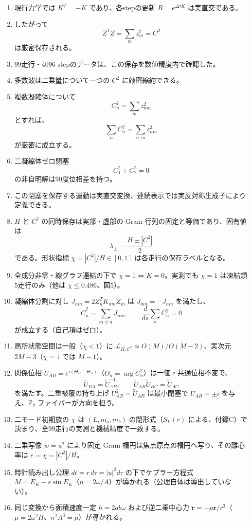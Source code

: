 \documentclass[
  a4paper,
]{ltjsarticle}
\providecommand{\tightlist}{%
  \setlength{\itemsep}{0pt}\setlength{\parskip}{0pt}}
\begin{document}
\begin{enumerate}
\def\labelenumi{\arabic{enumi}.}
\tightlist
\item
  現行力学では \(K^T=-K\) であり、各stepの更新 \(R=e^{\Delta\tau K}\)
  は実直交である。
\item
  したがって \[
  Z^TZ=\sum_mz_m^2=C^2
  \] は厳密保存される。
\item
  99走行・4096 stepのデータは、この保存を数値精度内で確認した。
\item
  多数波は二乗量について一つの \(C^2\) に厳密縮約できる。
\item
  複数凝縮体について \[
  C_n^2=\sum_mz_{nm}^2
  \] とすれば、 \[
  \sum_nC_n^2=\sum_{n,m}z_{nm}^2
  \] が厳密に成立する。
\item
  二凝縮体ゼロ閉塞 \[
  C_1^2+C_2^2=0
  \] の非自明解は90度位相差を持つ。
\item
  この閉塞を保存する運動は実直交変換、連続表示では実反対称生成子により定義できる。
\item
  \(H\) と \(C^2\) の同時保存は実部・虚部の Gram
  行列の固定と等価であり、固有値は \[
  \lambda_\pm=\frac{H\pm|C^2|}{2}
  \] である。形状指標 \(\chi=|C^2|/H\in[0,1]\)
  は各走行の保存ラベルとなる。
\item
  全成分非零・線グラフ連結の下で \(\chi=1\iff K=0\)。実測でも \(\chi=1\)
  は凍結類5走行のみ（他は \(\chi\le0.486\)、図5）。
\item
  凝縮体分割に対し \(J_{nm}=2Z_n^TK_{nm}Z_m\) は \(J_{mn}=-J_{nm}\)
  を満たし、 \[
  \dot C_n^2=\sum_{m\ne n}J_{nm},
  \qquad
  \frac{d}{ds}\sum_nC_n^2=0
  \] が成立する（自己項はゼロ）。
\item
  局所状態空間は一般（\(\chi<1\)）に
  \(\mathcal L_{H,C^2}\simeq O(M)/O(M-2)\)、実次元 \(2M-3\)（\(\chi=1\)
  では \(M-1\)）。
\item
  関係位相
  \(\tilde U_{AB}=e^{i(\Theta_B-\Theta_A)}\)（\(\Theta_n=\arg C_n^2\)）は一価・共通位相不変で、
  \[
  \tilde U_{BA}=\tilde U_{AB}^{-1},
  \qquad
  \tilde U_{AB}\tilde U_{BC}=\tilde U_{AC}
  \] を満たす。二重被覆の持ち上げ \(U_{AB}^2=\tilde U_{AB}\)
  は最小閉塞で \(U_{AB}=\pm i\) を与え、\(\mathbb Z_2\)
  ファイバーが方向を担う。
\item
  二モード初期族の \(\chi\) は \((L,m_a,m_b)\) の閉形式（\(S_L(r)\)
  による、付録C）で決まり、全99走行の実測と機械精度で一致する。
\item
  二乗写像 \(w=u^2\) により固定 Gram
  楕円は焦点原点の楕円へ写り、その離心率は \(e=\chi=|C^2|/H\)。
\item
  時計読み出し公理 \(dt=r\,d\tau=|u|^2d\tau\) の下でケプラー方程式
  \(M=E_K-e\sin E_K\)（\(n=2\omega/A\)）が導かれる（公理自体は導出していない）。
\item
  同じ変換から面積速度一定 \(h=2ab\omega\) および逆二乗中心力
  \(\ddot{\mathbf r}=-\mu\mathbf r/r^3\)（\(\mu=2\omega^2H\)、\(n^2A^3=\mu\)）が導かれる。
\end{enumerate}
\end{document}
